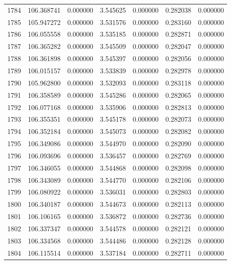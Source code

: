 \begin{tabular}{rrrrrrr}
1784 & 106.368741 &    0.000000 &  3.545625 &    0.000000 &    0.282038 &  0.000000 \\
1785 & 105.947272 &    0.000000 &  3.531576 &    0.000000 &    0.283160 &  0.000000 \\
1786 & 106.055558 &    0.000000 &  3.535185 &    0.000000 &    0.282871 &  0.000000 \\
1787 & 106.365282 &    0.000000 &  3.545509 &    0.000000 &    0.282047 &  0.000000 \\
1788 & 106.361898 &    0.000000 &  3.545397 &    0.000000 &    0.282056 &  0.000000 \\
1789 & 106.015157 &    0.000000 &  3.533839 &    0.000000 &    0.282978 &  0.000000 \\
1790 & 105.962800 &    0.000000 &  3.532093 &    0.000000 &    0.283118 &  0.000000 \\
1791 & 106.358589 &    0.000000 &  3.545286 &    0.000000 &    0.282065 &  0.000000 \\
1792 & 106.077168 &    0.000000 &  3.535906 &    0.000000 &    0.282813 &  0.000000 \\
1793 & 106.355351 &    0.000000 &  3.545178 &    0.000000 &    0.282073 &  0.000000 \\
1794 & 106.352184 &    0.000000 &  3.545073 &    0.000000 &    0.282082 &  0.000000 \\
1795 & 106.349086 &    0.000000 &  3.544970 &    0.000000 &    0.282090 &  0.000000 \\
1796 & 106.093696 &    0.000000 &  3.536457 &    0.000000 &    0.282769 &  0.000000 \\
1797 & 106.346055 &    0.000000 &  3.544868 &    0.000000 &    0.282098 &  0.000000 \\
1798 & 106.343089 &    0.000000 &  3.544770 &    0.000000 &    0.282106 &  0.000000 \\
1799 & 106.080922 &    0.000000 &  3.536031 &    0.000000 &    0.282803 &  0.000000 \\
1800 & 106.340187 &    0.000000 &  3.544673 &    0.000000 &    0.282113 &  0.000000 \\
1801 & 106.106165 &    0.000000 &  3.536872 &    0.000000 &    0.282736 &  0.000000 \\
1802 & 106.337347 &    0.000000 &  3.544578 &    0.000000 &    0.282121 &  0.000000 \\
1803 & 106.334568 &    0.000000 &  3.544486 &    0.000000 &    0.282128 &  0.000000 \\
1804 & 106.115514 &    0.000000 &  3.537184 &    0.000000 &    0.282711 &  0.000000 \\

\end{tabular}
